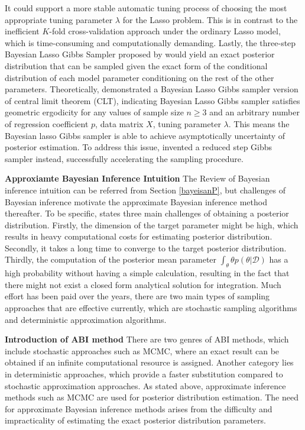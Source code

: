 It could support a more stable automatic tuning process of choosing the most appropriate tuning parameter $\lambda$ for the Lasso problem. This is in contrast to the inefficient $K$-fold cross-validation approach under the ordinary Lasso model, which is time-consuming and computationally demanding. Lastly, the three-step Bayesian Lasso Gibbs Sampler proposed by \cite{park_casella_2008} would yield an exact posterior distribution that can be sampled given the exact form of the conditional distribution of each model parameter conditioning on the rest of the other parameters. Theoretically, \cite{khare_hobert_2013} demonstrated a Bayesian Lasso Gibbs sampler version of central limit theorem (CLT), indicating Bayesian Lasso Gibbs sampler satisfies geometric ergodicity for any values of sample size $n \geq 3$ and an arbitrary number of regression coefficient $p$, data matrix $X$, tuning parameter $\lambda$. This means the Bayesian lasso Gibbs sampler is able to achieve asymptotically uncertainty of posterior estimation. To address this issue, \cite{FastBL} invented a reduced step Gibbs sampler instead, successfully accelerating the sampling procedure. 

\textbf{Approxiamte Bayesian Inference Intuition}
The Review of Bayesian inference intuition can be referred from Section \ref{bayeisanP}, but challenges of Bayesian inference motivate the approximate Bayesian inference method thereafter. To be specific, \cite{bishop_2006} states three main challenges of obtaining a posterior distribution. Firstly, the dimension of the target parameter might be high, which results in heavy computational costs for estimating posterior distribution. Secondly, it takes a long time to converge to the target posterior distribution. Thirdly, the computation of the posterior mean parameter $\int_{\theta} \theta p(\theta|\mathcal{D})$ has a high probability without having a simple calculation, resulting in the fact that there might not exist a closed form analytical solution for integration. Much effort has been paid over the years, there are two main types of sampling approaches that are effective currently, which are stochastic sampling algorithms and deterministic approximation algorithms. 

\textbf{Introduction of ABI method}
There are two genres of ABI methods, which include stochastic approaches such as MCMC, where an exact result can be obtained if an infinite computational resource is assigned. Another category lies in deterministic approaches, which provide a faster substitution compared to stochastic approximation approaches.
As stated above, approximate inference methods such as MCMC are used for posterior distribution estimation. The need for approximate Bayesian inference methods arises from the difficulty and impracticality of estimating the exact posterior distribution parameters.

